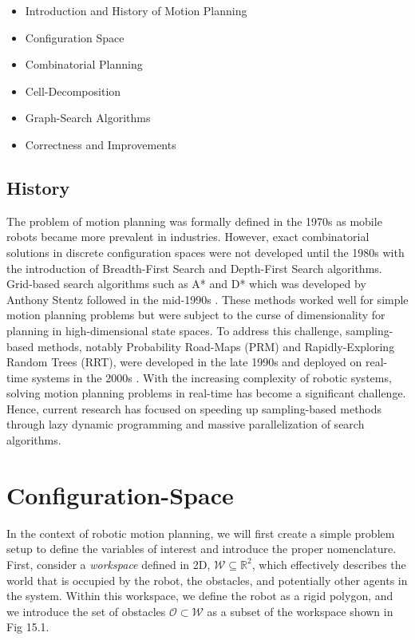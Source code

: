 \documentclass[twoside]{article}
\begin{document}
\begin{itemize}
  \item Introduction and History of Motion Planning
  \item Configuration Space
  \item Combinatorial Planning 
  \item Cell-Decomposition
  \item Graph-Search Algorithms
  \item Correctness and Improvements

\end{itemize}


\subsection{ History }

The problem of motion planning was formally defined in the 1970s as mobile robots became more prevalent in industries. However, exact combinatorial solutions in discrete configuration spaces were not developed until the 1980s with the introduction of Breadth-First Search and Depth-First Search algorithms. Grid-based search algorithms such as A* and D* which was developed by Anthony Stentz followed in the mid-1990s \cite{bertsekas}. These methods worked well for simple motion planning problems but were subject to the curse of dimensionality for planning in high-dimensional state spaces. To address this challenge,
sampling-based methods, notably Probability Road-Maps (PRM) and Rapidly-Exploring Random Trees (RRT), were developed in the late 1990s and deployed on real-time systems in the 2000s \cite{lavalle}. With the increasing complexity of robotic systems, solving motion planning problems in real-time has become a significant challenge. Hence, current research has focused on speeding up sampling-based methods through lazy dynamic programming and massive parallelization of search algorithms. 

\section{Configuration-Space} \label{Configuration-Space}
In the context of robotic motion planning, we will first create a simple problem setup to define the variables of interest and introduce the proper nomenclature. First, consider a \textit{workspace} defined in 2D, $ \mathcal{W} \subseteq \mathbb{R}^2$, which effectively describes the world that is occupied by the robot, the obstacles, and potentially other agents in the system. Within this workspace, we define the robot as a rigid polygon, and we introduce the set of obstacles $\mathcal{O} \subset \mathcal{W}$ as a subset of the workspace shown in Fig 15.1.
\end{document}
